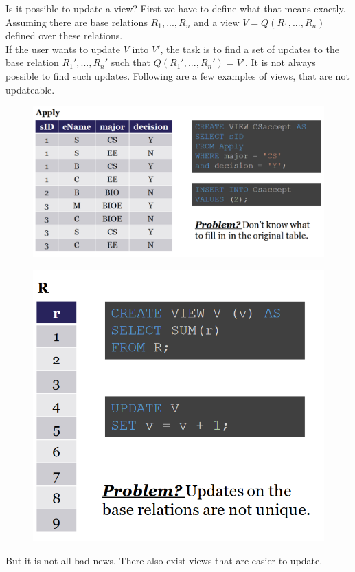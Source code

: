 Is it possible to update a view? First we have to define what that means exactly. Assuming there are base relations $R_1, ..., R_n$ and a view $V = Q(R_1, ..., R_n)$ defined over these relations. \\
If the user wants to update $V$ into $V'$, the task is to find a set of updates to the base relation $R_1', ..., R_n'$ such that $Q(R_1',...,R_n') = V'$. It is not always possible to find such updates. Following are a few examples of views, that are not updateable.
\begin{figure}[H]
\begin{minipage}[t]{.5\textwidth}
\centering
\includegraphics[width=.97\textwidth]{images/projection_update.PNG}
\label{projection_update}
\end{minipage}
\begin{minipage}[t]{.5\textwidth}
\centering
\includegraphics[width=.6\textwidth]{images/aggregation_view.PNG}
\label{aggregation_view}
\end{minipage}
\end{figure}
\noindent But it is not all bad news. There also exist views that are easier to update.
